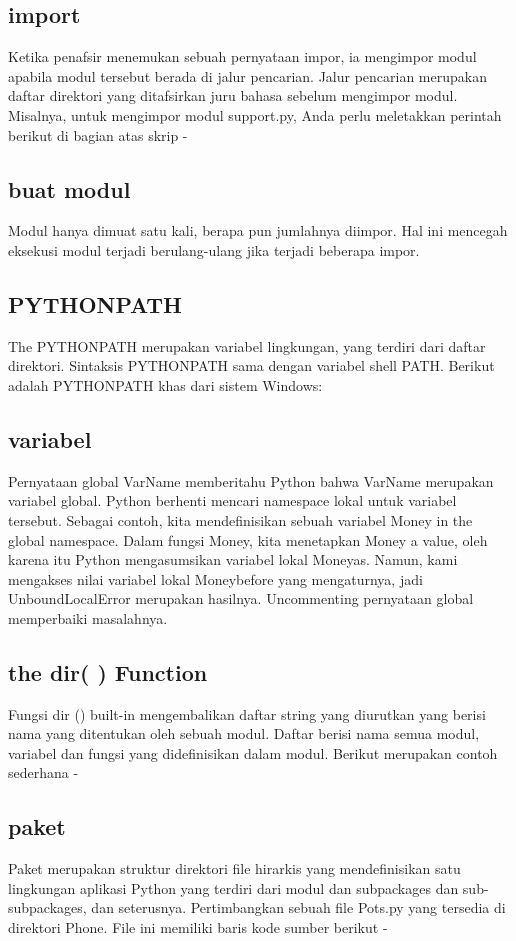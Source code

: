 \subsection{import}
Ketika penafsir menemukan sebuah pernyataan impor, ia mengimpor modul apabila modul tersebut berada di jalur pencarian. Jalur pencarian merupakan daftar direktori yang ditafsirkan juru bahasa sebelum mengimpor modul. Misalnya, untuk mengimpor modul support.py, Anda perlu meletakkan perintah berikut di bagian atas skrip - 
 
\subsection{buat modul}Modul hanya dimuat satu kali, berapa pun jumlahnya diimpor. Hal ini mencegah eksekusi modul terjadi berulang-ulang jika terjadi beberapa impor.
 

\subsection{PYTHONPATH} 
The PYTHONPATH merupakan variabel lingkungan, yang terdiri dari daftar direktori. Sintaksis PYTHONPATH sama dengan variabel shell PATH. 
Berikut adalah PYTHONPATH khas dari sistem Windows:
 
\subsection{variabel}
Pernyataan global VarName memberitahu Python bahwa VarName merupakan variabel global. Python berhenti mencari namespace lokal untuk variabel tersebut. 
Sebagai contoh, kita mendefinisikan sebuah variabel Money in the global namespace. Dalam fungsi Money, kita menetapkan Money a value, oleh karena itu Python mengasumsikan variabel lokal Moneyas. Namun, kami mengakses nilai variabel lokal Moneybefore yang mengaturnya, jadi UnboundLocalError merupakan hasilnya. Uncommenting pernyataan global memperbaiki masalahnya.
 
\subsection{the dir( ) Function}
Fungsi dir () built-in mengembalikan daftar string yang diurutkan yang berisi nama yang ditentukan oleh sebuah modul.
Daftar berisi nama semua modul, variabel dan fungsi yang didefinisikan dalam modul. Berikut merupakan contoh sederhana - 

\subsection{paket}
Paket merupakan struktur direktori file hirarkis yang mendefinisikan satu lingkungan aplikasi Python yang terdiri dari modul dan subpackages dan sub-subpackages, dan seterusnya.
Pertimbangkan sebuah file Pots.py yang tersedia di direktori Phone. File ini memiliki baris kode sumber berikut -

